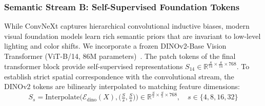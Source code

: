 \subsubsection{Semantic Stream B: Self-Supervised Foundation Tokens}
While ConvNeXt captures hierarchical convolutional inductive biases, modern visual foundation models learn rich semantic priors that are invariant to low-level lighting and color shifts. We incorporate a frozen DINOv2-Base Vision Transformer (ViT-B/14, 86M parameters)~\cite{dinov2}. The patch tokens of the final transformer block provide self-supervised representations $S_{14} \in \mathbb{R}^{\frac{S}{14} \times \frac{S}{14} \times 768}$. To establish strict spatial correspondence with the convolutional stream, the DINOv2 tokens are bilinearly interpolated to matching feature dimensions:
\begin{equation}
    S_s = \mathrm{Interpolate}\big(\mathcal{E}_{\mathrm{dino}}(X), \big(\tfrac{S}{s}, \tfrac{S}{s}\big)\big) \in \mathbb{R}^{\frac{S}{s} \times \frac{S}{s} \times 768}, \quad s \in \{4, 8, 16, 32\}
\end{equation}

